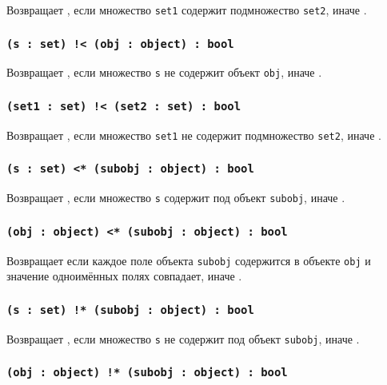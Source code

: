 Возвращает \true, если множество \texttt{set1} содержит подмножество \texttt{set2}, иначе \false.

\subsubsection{\texttt{(s : set) !< (obj : object) : bool}}

Возвращает \true{}, если множество \texttt{s} не содержит объект \texttt{obj}, иначе \false{}.

\subsubsection{\texttt{(set1 : set) !< (set2 : set) : bool}}

Возвращает \true, если множество \texttt{set1} не содержит подмножество \texttt{set2}, иначе \false.

\subsubsection{\texttt{(s : set) <* (subobj : object) : bool}}

Возвращает \true{}, если множество \texttt{s} содержит под объект \texttt{subobj}, иначе \false{}.

\subsubsection{\texttt{(obj : object) <* (subobj : object) : bool}}

Возвращает \true{} если каждое поле объекта \texttt{subobj} содержится в объекте \texttt{obj} и значение одноимённых полях совпадает, иначе \false{}.

\subsubsection{\texttt{(s : set) !* (subobj : object) : bool}}

Возвращает \true{}, если множество \texttt{s} не содержит под объект \texttt{subobj}, иначе \false{}.

\subsubsection{\texttt{(obj : object) !* (subobj : object) : bool}}

